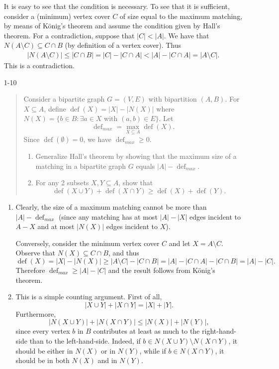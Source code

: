 \documentclass[12pt]{article}
\begin{document}
\begin{enumerate}

 It is easy to see that the condition is necessary.
  To see that it is sufficient, consider a (minimum) vertex cover $C$
  of size equal to the maximum matching, by means of K\"{o}nig's
  theorem and assume the condition given by Hall's theorem. For a
  contradiction, suppose that $|C|< |A|$. We have that $N(A
  \setminus C) \subseteq C \cap B$ (by definition of a vertex cover).
  Thus
\begin{align*}
  |N(A\setminus C)| \leq |C \cap B| =|C| - |C
  \cap A| < |A| - |C \cap A| = |A \setminus C|.
\end{align*}
This is a contradiction.

\item[1-10] %
\begin{quote}
Consider a bipartite graph $G=(V,E)$ with bipartition $(A,B)$. For
$X\subseteq A$, define $\operatorname{def}(X)=|X|-|N(X)|$ where $N(X)=\{b\in B:
\exists a\in X$ with $(a,b)\in E\}$. Let $$\operatorname{def}_{max}=
\max_{X\subseteq A} \operatorname{def}(X).$$ Since $\operatorname{def}(\emptyset)=0$, we have
$\operatorname{def}_{max}\geq 0$.  
\begin{enumerate}
\item
Generalize Hall's theorem by showing that the maximum size of a
matching in a bipartite graph $G$ equals $|A|-\operatorname{def}_{max}$. 
\item
For any 2 subsets $X, Y\subseteq A$, show that 
$$\operatorname{def}(X\cup Y) + \operatorname{def}(X\cap Y) \geq \operatorname{def}(X) + \operatorname{def}(Y).$$
\end{enumerate}
\end{quote}

\begin{enumerate}
\item
Clearly, the size of a maximum matching cannot be more than
$|A|-\operatorname{def}_{max}$ (since any matching has at
most $|A|-|X|$ edges incident to $A-X$ and at most $|N(X)|$ edges
incident to $X$).

Conversely, consider the minimum vertex cover $C$ and let
$X=A\setminus C$. Observe that $N(X)\subseteq C\cap B$, and thus
$$\operatorname{def}(X) =|X|-|N(X)|\geq |A\setminus C| - |C \cap B| =
|A| - |C \cap A|- |C\cap B|=|A|-|C|.$$  Therefore
$\operatorname{def}_{max}\geq |A|-|C|$ and the result follows from
K\"onig's theorem. 
\item
This is a simple counting argument. First of all, $$|X\cup Y|+|X\cap
Y|=|X|+|Y|.$$ Furthermore, $$|N(X\cup Y)| + |N(X\cap Y)| \leq |N(X)| +
|N(Y)|,$$ since every vertex $b$ in $B$ contributes at least as much
to the right-hand-side than to the left-hand-side. Indeed, if $b\in
N(X\cup Y)\setminus N(X\cap Y)$, it should be either in $N(X)$ or in
$N(Y)$, while if $b\in N(X \cap Y)$, it should be in both $N(X)$ and in $N(Y)$.
\end{enumerate}


\end{enumerate}
\end{document}
